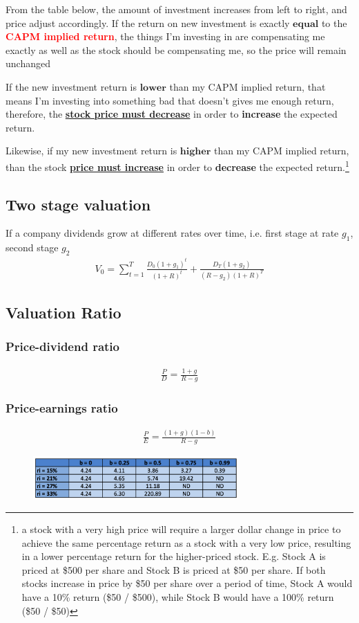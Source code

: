 \begin{multicols}{2}
From the table below, the amount of investment increases from left to right, and price adjust accordingly. If the return on new investment is exactly $\boxed{\textbf{equal}}$ to the \textcolor{red}{\textbf{CAPM implied return}}, the things I'm investing in are compensating me exactly as well as the stock should be compensating me, so the price will remain unchanged\par 

If the new investment return is $\boxed{\textbf{lower}}$ than my CAPM implied return, that means I'm investing into something bad that doesn't gives me enough return, therefore, the \underline{\textbf{stock price must decrease}} in order to \textbf{increase} the expected return. 

Likewise, if my new investment return is $\boxed{\textbf{higher}}$ than my CAPM implied return, than the stock \underline{\textbf{price must increase}} in order to \textbf{decrease} the expected return.\footnote{a stock with a very high price will require a larger dollar change in price to achieve the same percentage return as a stock with a very low price, resulting in a lower percentage return for the higher-priced stock. E.g. Stock A is priced at \$500 per share and Stock B is priced at \$50 per share. If both stocks increase in price by \$50 per share over a period of time, Stock A would have a 10\% return (\$50 / \$500), while Stock B would have a 100\% return (\$50 / \$50)}


\subsection{Two stage valuation}
If a company dividends grow at different rates over time, i.e. first stage at rate $g_1$, second stage $g_2$ 
\begin{gather*}
    V_0 = \sum_{t =1}^{T}\frac{D_0(1+g_1)^t}{(1+R)^t} + \frac{D_T(1+g_2)}{(R-g_2)(1+R)^T}
\end{gather*}

\subsection{Valuation Ratio}
\subsubsection{Price-dividend ratio}
\begin{gather*}
    \frac{P}{D} = \frac{1+g}{R-g}
\end{gather*}

\subsubsection{Price-earnings ratio}
\begin{gather*}
    \frac{P}{E} = \frac{(1+g)(1-b)}{R-g}
\end{gather*}

\end{multicols}

\begin{figure}[H]
    \centering 
    \includegraphics[width =0.7\textwidth]{Figure/table.png}
\end{figure}


